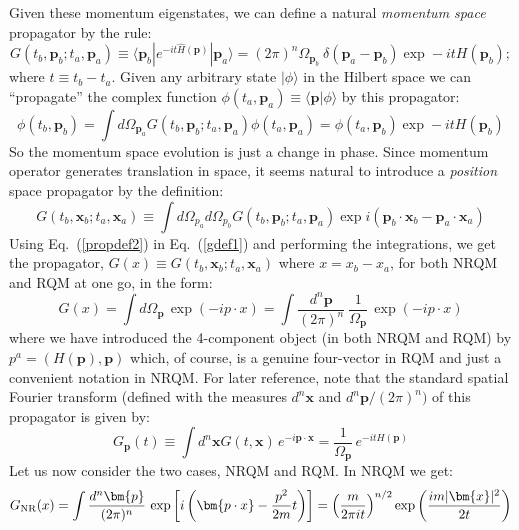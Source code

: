 \documentclass{article}
\def\eq#1{{Eq.~(\ref{#1})}}
\def\frab#1#2{\left(\frac{#1}{#2}\right)}
\def\ket#1{|#1\rangle}                    %
\def\bk#1#2#3{{\langle #1|#2|#3\rangle}}  %
\def\amp#1#2{\langle #1 | #2\rangle}      %
\begin{document}
 Given these momentum eigenstates, we can  define a natural \textit{momentum space} propagator by the rule:
 \begin{equation}
 G(t_b,\bm{p}_b; t_a,\bm{p}_a) \equiv \bk{\bm{p}_b}{e^{-it \hat{H}(\bm{p})}}{\bm{p}_a}
 =(2\pi)^n \Omega_{\bm{p}_b}\ \delta (\bm{p}_a- \bm{p}_b)\exp-itH(\bm{p}_b);
 \label{propdef2}
\end{equation}
where $t\equiv t_b-t_a$. Given any arbitrary state $\ket{\phi}$ in the Hilbert space we can ``propagate'' the complex function $\phi(t_a,\bm{p}_a)\equiv \amp{\bm{p}}{\phi}$ by this propagator:
\begin{equation}
 \phi(t_b,\bm{p}_b)=\int d\Omega_{\bm{p}_a} G(t_b,\bm{p}_b; t_a,\bm{p}_a)\phi(t_a,\bm{p}_a)=\phi(t_a,\bm{p}_b)\exp-itH(\bm{p}_b)
 \label{momevl}
\end{equation} 
So the momentum space evolution is just a change in phase.
Since momentum operator generates translation in space, it seems natural to introduce
a \textit{position} space propagator by the definition:
 \begin{equation}
 G(t_b,\bm{x}_b; t_a,\bm{x}_a)\equiv \int d\Omega_{p_a}d\Omega_{p_b}G(t_b,\bm{p}_b; t_a,\bm{p}_a)\exp i(\bm{p}_b \cdot \bm{x}_b -\bm{p}_a \cdot \bm{x}_a)
 \label{gdef1}
\end{equation}
Using \eq{propdef2} in \eq{gdef1} and
performing the integrations, we get the  propagator, $G(x)\equiv G(t_b,\bm{x}_b; t_a,\bm{x}_a)$ where $x=x_b-x_a$, for both NRQM and RQM at one go,
 in the form:
 \begin{equation}
G(x) = \int  d\Omega_{\bm{p}} \, \exp(- i p\cdot x) = \int \frac{d^n \bm{p}}{(2\pi)^n}\ \frac{1}{\Omega_{\bm{p}}} \, \exp(-ip\cdot x)
\label{ggen}
\end{equation} 
where we have introduced the 4-component object (in both NRQM and RQM) by
$
 p^a = (H(\bm{p}), \bm{p})
$ which, of course, is a genuine four-vector in RQM and just a convenient notation in NRQM.
For later reference, note that the standard spatial Fourier transform (defined with the measures $d^n\bm{x}$ and $d^n\bm{p}/(2\pi)^n)$ of this propagator is given by:
\begin{equation}
 G_{\bm{p}} (t)\equiv  \int d^n\bm{x} G(t, \bm{x}) \, e^{-i\bm{p\cdot x}} = \frac{1}{\Omega_{\bm{p}}}\, e^{ - i tH(\bm{p})}
 \label{spaceft}
\end{equation}
Let us now consider the two cases, NRQM and RQM. 
In NRQM we get:
 \begin{equation}
 G_{\rm NR}(x) = \int \frac{d^n \bm{p}}{(2\pi)^n} \, \exp\left[i\left(\bm{p\cdot x} - \frac{p^2}{2m} t\right)\right]
 = \frab{m}{2\pi it }^{n/2} \exp\frab{im|\bm{x}|^2}{2t} 
 \label{nrqmg}
\end{equation} 
\end{document}
